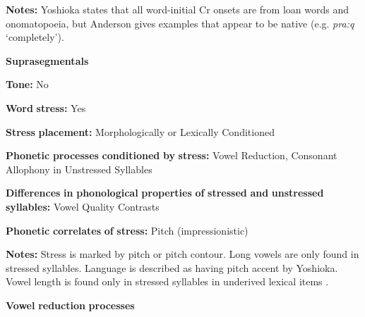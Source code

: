 \begin{styleBody}
\textbf{Notes:} Yoshioka states that all word-initial Cr onsets are from loan words and onomatopoeia, but Anderson gives examples that appear to be native (e.g. \textit{pra:q} ‘completely’).
\end{styleBody}

\begin{styleBody}
\textbf{Suprasegmentals}
\end{styleBody}

\begin{styleBody}
\textbf{Tone:} No
\end{styleBody}

\begin{styleBody}
\textbf{Word} \textbf{stress:} Yes
\end{styleBody}

\begin{styleBody}
\textbf{Stress} \textbf{placement:} Morphologically or Lexically Conditioned
\end{styleBody}

\begin{styleBody}
\textbf{Phonetic} \textbf{processes} \textbf{conditioned} \textbf{by} \textbf{stress:} Vowel Reduction, Consonant Allophony in Unstressed Syllables
\end{styleBody}

\begin{styleBody}
\textbf{Differences} \textbf{in} \textbf{phonological} \textbf{properties} \textbf{of} \textbf{stressed} \textbf{and} \textbf{unstressed} \textbf{syllables:} Vowel Quality Contrasts
\end{styleBody}

\begin{styleBody}
\textbf{Phonetic} \textbf{correlates} \textbf{of} \textbf{stress:} Pitch (impressionistic)
\end{styleBody}

\begin{styleBody}
\textbf{Notes:} Stress is marked by pitch or pitch contour. Long vowels are only found in stressed syllables. Language is described as having pitch accent by Yoshioka. Vowel length is found only in stressed syllables in underived lexical items \citep{Anderson1028}.
\end{styleBody}

\begin{styleBody}
\textbf{Vowel} \textbf{reduction} \textbf{processes}
\end{styleBody}

